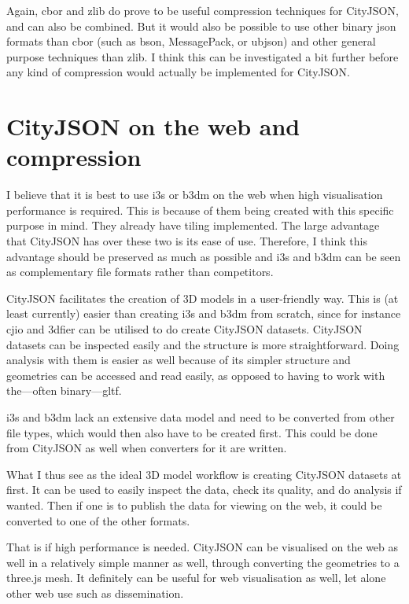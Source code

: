 Again, \ac{cbor} and zlib do prove to be useful compression techniques for CityJSON, and can also be combined.
But it would also be possible to use other binary \ac{json} formats than \ac{cbor} (such as \ac{bson}, MessagePack, or \ac{ubjson}) and other general purpose techniques than zlib.
I think this can be investigated a bit further before any kind of compression would actually be implemented for CityJSON.








\section{CityJSON on the web and compression}
\label{concl:cj}

I believe that it is best to use \ac{i3s} or \ac{b3dm} on the web when high visualisation performance is required.
This is because of them being created with this specific purpose in mind.
They already have tiling implemented.
The large advantage that CityJSON has over these two is its ease of use.
Therefore, I think this advantage should be preserved as much as possible and \ac{i3s} and \ac{b3dm} can be seen as complementary file formats rather than competitors.

CityJSON facilitates the creation of 3D models in a user-friendly way.
This is (at least currently) easier than creating \ac{i3s} and \ac{b3dm} from scratch, since for instance cjio and 3dfier can be utilised to do create CityJSON datasets.
CityJSON datasets can be inspected easily and the structure is more straightforward.
Doing analysis with them is easier as well because of its simpler structure and geometries can be accessed and read easily, as opposed to having to work with the---often binary---\ac{gltf}.

\ac{i3s} and \ac{b3dm} lack an extensive data model and need to be converted from other file types, which would then also have to be created first.
This could be done from CityJSON as well when converters for it are written.

What I thus see as the ideal 3D model workflow is creating CityJSON datasets at first.
It can be used to easily inspect the data, check its quality, and do analysis if wanted.
Then if one is to publish the data for viewing on the web, it could be converted to one of the other formats.

That is if high performance is needed.
CityJSON can be visualised on the web as well in a relatively simple manner as well, through converting the geometries to a three.js mesh.
It definitely can be useful for web visualisation as well, let alone other web use such as dissemination.

